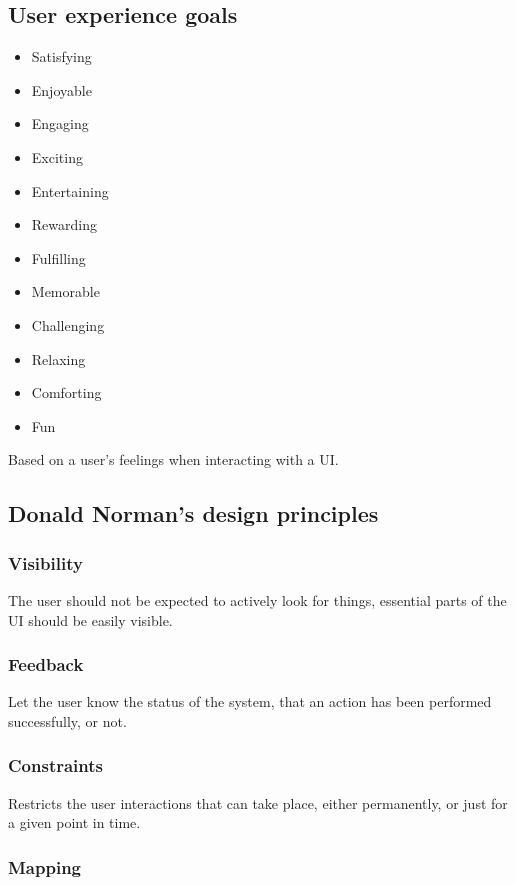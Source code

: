 \subsection{User experience goals}

\begin{itemize}
    \item Satisfying
    \item Enjoyable
    \item Engaging
    \item Exciting
    \item Entertaining
    \item Rewarding
    \item Fulfilling
    \item Memorable
    \item Challenging
    \item Relaxing
    \item Comforting
    \item Fun
\end{itemize}

Based on a user's feelings when interacting with a UI.


\subsection{Donald Norman's design principles}

\subsubsection{Visibility}

The user should not be expected to actively look for things, essential parts of the UI should be easily visible.


\subsubsection{Feedback}

Let the user know the status of the system, that an action has been performed successfully, or not.


\subsubsection{Constraints}

Restricts the user interactions that can take place, either permanently, or just for a given point in time.


\subsubsection{Mapping}

